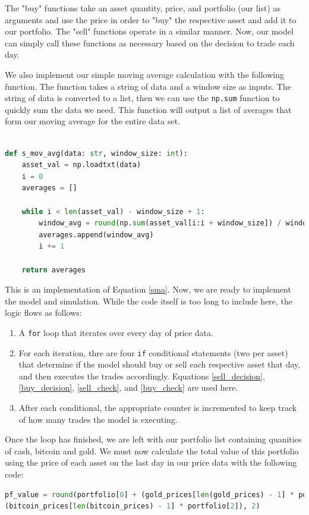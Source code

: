 \documentclass[12pt]{article}
\begin{document}
The "buy" functions take an asset quantity, price, and portfolio (our list) as arguments and use the price in order to "buy" the respective
asset and add it to our portfolio. The "sell" functions operate in a similar manner. Now, our model can simply call these functions as necessary
based on the decision to trade each day.

We also implement our simple moving average calculation with the following function. The function takes a string of data and a window size as inputs.
The string of data is converted to a list, then we can use the \verb|np.sum| function to quickly sum the data we need. This function will output a list
of averages that form our moving average for the entire data set.
\\\\
\begin{lstlisting}[language=Python]
    def s_mov_avg(data: str, window_size: int):
    asset_val = np.loadtxt(data)
    i = 0
    averages = []

    while i < len(asset_val) - window_size + 1:
        window_avg = round(np.sum(asset_val[i:i + window_size]) / window_size, 2)
        averages.append(window_avg)
        i += 1

    return averages

\end{lstlisting}
This is an implementation of Equation \eqref{sma}.
Now, we are ready to implement the model and simulation. While the code itself is too long to include here, the logic flows as follows:
\begin{enumerate}
    \item A \verb|for| loop that iterates over every day of price data.
    \item For each iteration, thre are four \verb|if| conditional statements (two per asset) that determine if the model should buy or sell each respective asset that day, and then executes the trades accordingly. Equations
    \eqref{sell_decision}, \eqref{buy_decision}, \eqref{sell_check}, and \eqref{buy_check} are used here.
    \item After each conditional, the appropriate counter is incremented to keep track of how many trades the model is executing.
\end{enumerate}

Once the loop has finished, we are left with our portfolio list containing quanities of cash, bitcoin and gold. We must now calculate the total value of this portfolio
using the price of each asset on the last day in our price data with the following code:
\\
\begin{lstlisting}[language=Python]
pf_value = round(portfolio[0] + (gold_prices[len(gold_prices) - 1] * portfolio[1]) + 
(bitcoin_prices[len(bitcoin_prices) - 1] * portfolio[2]), 2)
\end{lstlisting}
\end{document}
